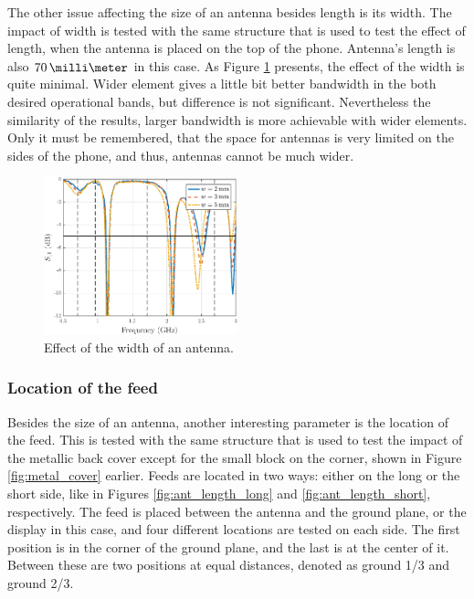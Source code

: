 The other issue affecting the size of an antenna besides length is its width. The impact of width is tested with the same structure that is used to test the effect of length, when the antenna is placed on the top of the phone. Antenna's length is also $70\,\milli\meter$ in this case. As Figure \ref{fig:width_res} presents, the effect of the width is quite minimal. Wider element gives a little bit better bandwidth in the both desired operational bands, but difference is not significant. Nevertheless the similarity of the results, larger bandwidth is more achievable with wider elements. Only it must be remembered, that the space for antennas is very limited on the sides of the phone, and thus, antennas cannot be much wider.

\begin{figure}[H]
    \centering
    \includegraphics[width=0.5\textwidth]{img/width_res.eps}
    \caption{Effect of the width of an antenna.}
    \label{fig:width_res}
\end{figure}


\subsubsection{Location of the feed}
\label{sec:feed}
Besides the size of an antenna, another interesting parameter is the location of the feed. This is tested with the same structure that is used to test the impact of the metallic back cover except for the small block on the corner, shown in Figure \ref{fig:metal_cover} earlier. Feeds are located in two ways: either on the long or the short side, like in Figures \ref{fig:ant_length_long} and \ref{fig:ant_length_short}, respectively. The feed is placed between the antenna and the ground plane, or the display in this case, and four different locations are tested on each side. The first position is in the corner of the ground plane, and the last is at the center of it. Between these are two positions at equal distances, denoted as ground 1/3 and ground 2/3.

